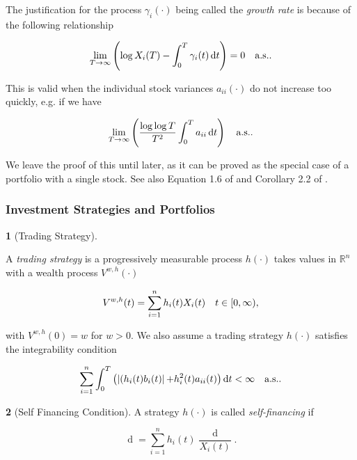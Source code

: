 \documentclass[british]{amsart} \usepackage{lmodern}
\numberwithin{equation}{section} \numberwithin{figure}{section}
\theoremstyle{plain} \newtheorem{thm}{\protect\theoremname}[section]
\theoremstyle{definition} \newtheorem{defn}[thm]{\protect\definitionname}
\theoremstyle{plain} \newtheorem{assumption}[thm]{\protect\assumptionname}
\theoremstyle{plain} \newtheorem{lem}[thm]{\protect\lemmaname}
\theoremstyle{plain} \newtheorem{prop}[thm]{\protect\propositionname}
\theoremstyle{remark} \newtheorem{rem}[thm]{\protect\remarkname}
\theoremstyle{plain} \newtheorem{cor}[thm]{\protect\corollaryname}
\renewcommand{\d}[1]{\mathop{\mathrm{d}{#1}}}
\newcommand{\abs}[1]{\mathop{|{#1}|}} \newcommand{\market}{\mathcal{M}}
\begin{document}
The justification for the process $\gamma_{i}(\cdot)$ being called the 
\textit{growth rate} is because of the following relationship

\begin{equation}
  \lim_{T \to \infty} 
    \left( 
    \log{X_{i}(T)} - \int_{0}^{T} \gamma_{i}(t)\d{t} 
    \right) = 0
  \quad \almostsurely.
\end{equation}

This is valid when the individual stock variances $a_{ii}(\cdot)$ do not
increase too quickly, e.g. if we have 

\begin{equation*}
  \lim_{T\to\infty} \left( \frac{\log \log T}{T^2} \int_{0}^{T} a_{ii} \d{t} \right)
  \quad \almostsurely.
\end{equation*}

We leave the proof of this until later, as it can be proved as the special case
of a portfolio with a single stock. See also Equation 1.6 of \cite{fernholz2009} and Corollary 2.2 of \cite{fernholz1999pgf}.

\subsubsection{Investment Strategies and Portfolios}

\begin{defn} [Trading Strategy]
  \label{def:tradingstrategy}

  A \textit{trading strategy} is a progressively measurable process $h(\cdot)$ 
  takes values in $\mathbb{R}^{n}$ with a wealth process $V^{w,h}(\cdot)$ 

  \begin{equation*}
    V^{w,h}(t) = \sum_{i=1}^{n} h_{i}(t) X_{i}(t) 
    \quad t\in[0,\infty),
  \end{equation*}

  with $V^{w,h}(0)=w$ for $w > 0$. We also assume a trading strategy $h(\cdot)$  
  satisfies the integrability condition

  \begin{equation*}
    \sum_{i=1}^{n} \int_{0}^{T} 
    \left(
    \abs{(h_{i}(t)b_{i}(t)} + h_{i}^2(t)a_{ii}(t)
      \right) \d{t} < \infty
    \quad \almostsurely.
  \end{equation*}

\end{defn}

\begin{defn} [Self Financing Condition]
  \label{def:selffinancingcondition}  
  A strategy $h(\cdot)$ is called \textit{self-financing} if 
  
  \begin{equation}
    \d{V^{w,h}(t)} = \sum_{i=1}^{n} h_{i}(t) \frac{\d{X_{i}(t)}}{X_{i}(t)}.
  \end{equation}

\end{defn}
\end{document}
